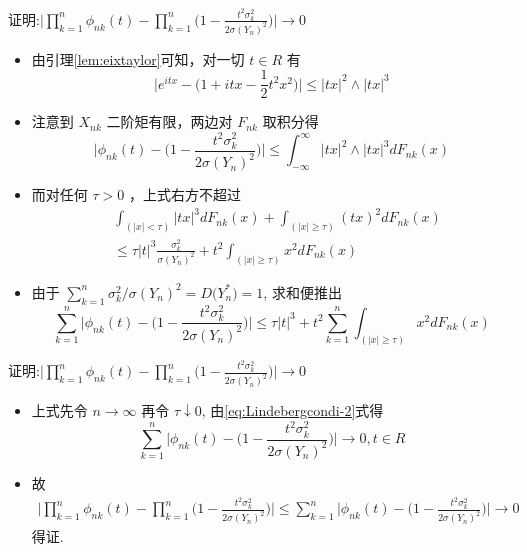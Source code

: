 \documentclass[Prob-All.tex]{subfiles}
\begin{document}
	\begin{frame}{证明:$\big|\prod_{k=1}^{n} \phi_{n k}(t)-\prod_{k=1}^{n}\big(1-\frac{t^{2} \sigma_{k}^{2}}{2 \sigma(Y_n)^2}\big)\big| \rightarrow 0$}
		\vspace{-0.1cm}
		\begin{itemize}
			\item 由引理\ref{lem:eixtaylor}可知，对一切 $t \in R$ 有
		\[
		\big|e^{i t x}-\big(1+i t x-\frac{1}{2} t^{2} x^{2}\big)\big| \leq|t x|^{2} \wedge|t x|^{3}
		\]
		\item 注意到 $X_{nk}$ 二阶矩有限，两边对 $F_{n k}$ 取积分得
		\[
		\big|\phi_{n k}(t)-\big(1-\frac{t^{2} \sigma_{k}^{2}}{2 \sigma(Y_n)^{2}}\big)\big| \leq \int_{-\infty}^\infty |tx|^2\wedge |tx|^3dF_{nk}(x)%
		\]
		\item 而对任何 $\tau>0$ ，上式右方不超过
		\begin{align*}
			&\int_{(|x|<\tau)}|t x|^{3} d F_{n k}(x)+\int_{(|x| \geq \tau)}(t x)^{2} d F_{n k}(x)\\
			&\leq \tau|t|^{3} \frac{\sigma_{k}^{2}}{\sigma(Y_n)^{2}}+t^{2} \int_{(|x| \geq \tau)} x^{2} d F_{n k}(x)
		\end{align*}
		\item 由于 $\sum_{k=1}^{n} \sigma_{k}^{2} / \sigma(Y_n)^{2}=D\big(Y_n^*\big)=1$, 求和便推出
		\[
		\sum_{k=1}^{n}\big|\phi_{n k}(t)-\big(1-\frac{t^{2} \sigma_{k}^{2}}{2 \sigma(Y_n)^{2}}\big)\big| \leq \tau|t|^{3}+t^{2} \sum_{k=1}^{n} \int_{(|x| \geq \tau)} x^{2} d F_{n k}(x)
		\]
		\end{itemize}
	\end{frame}

	\begin{frame}{证明:$\big|\prod_{k=1}^{n} \phi_{n k}(t)-\prod_{k=1}^{n}\big(1-\frac{t^{2} \sigma_{k}^{2}}{2 \sigma(Y_n)^2}\big)\big| \rightarrow 0$}
\begin{itemize}
	\item 上式先令 $n \rightarrow \infty$ 再令 $\tau \downarrow 0$, 由\eqref{eq:Lindebergcondi-2}式得
	\[
	\sum_{k=1}^{n}\big|\phi_{n k}(t)-\big(1-\frac{t^{2} \sigma_{k}^{2}}{2 \sigma(Y_n)^2}\big)\big| \rightarrow 0,  t \in R
	\]
	\item 故
	\begin{align*}
		\big|\prod_{k=1}^{n} \phi_{n k}(t)-\prod_{k=1}^{n}\big(1-\frac{t^{2} \sigma_{k}^{2}}{2 \sigma(Y_n)^2}\big)\big|\leq  \sum_{k=1}^{n}\big|\phi_{n k}(t)-\big(1-\frac{t^{2} \sigma_{k}^{2}}{2 \sigma(Y_n)^2}\big)\big| \rightarrow 0
	\end{align*}得证.
\end{itemize}
	\end{frame}
\end{document}
